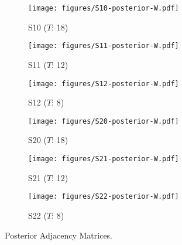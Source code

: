 \begin{figure}[h]
	\centering
	\begin{subfigure}{0.31\textwidth}
		\centering
		\texttt{[image: figures/S10-posterior-W.pdf]}
		\caption{S10 ($T$: 18)}
	\end{subfigure}
	\begin{subfigure}{0.31\textwidth}
		\centering
		\texttt{[image: figures/S11-posterior-W.pdf]}
		\caption{S11 ($T$: 12)}
	\end{subfigure}
	\begin{subfigure}{0.31\textwidth}
		\centering
		\texttt{[image: figures/S12-posterior-W.pdf]}
		\caption{S12 ($T$: 8)}
	\end{subfigure}
	\begin{subfigure}{0.31\textwidth}
		\centering
		\texttt{[image: figures/S20-posterior-W.pdf]}
		\caption{S20 ($T$: 18)}
	\end{subfigure}
	\begin{subfigure}{0.31\textwidth}
		\centering
		\texttt{[image: figures/S21-posterior-W.pdf]}
		\caption{S21 ($T$: 12)}
	\end{subfigure}
	\begin{subfigure}{0.31\textwidth}
		\centering
		\texttt{[image: figures/S22-posterior-W.pdf]}
		\caption{S22 ($T$: 8)}
		\label{fig:S22}
	\end{subfigure}
	\caption{Posterior Adjacency Matrices.}
	\label{fig:S1}
\end{figure}
